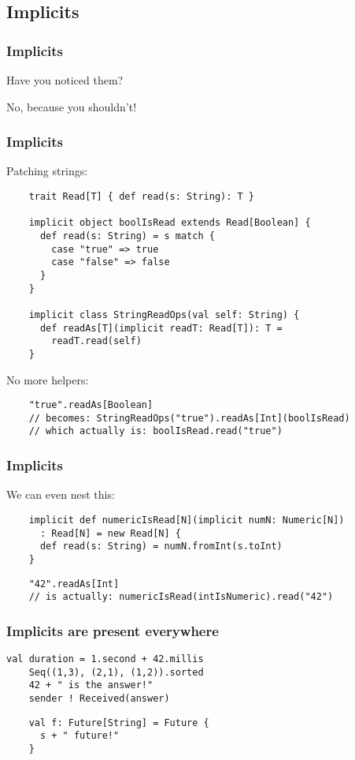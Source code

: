 \documentclass{beamer}
\begin{document}
\subsection{Implicits}

\begin{frame}
  \frametitle{Implicits}
  Have you noticed them?
  
  No, because you shouldn't!
\end{frame}

\begin{frame}[containsverbatim]
  \lstset{gobble=4}
  \frametitle{Implicits}
  Patching strings:
  \begin{lstlisting}
    trait Read[T] { def read(s: String): T }

    implicit object boolIsRead extends Read[Boolean] {
      def read(s: String) = s match {
        case "true" => true
        case "false" => false
      }
    }

    implicit class StringReadOps(val self: String) {
      def readAs[T](implicit readT: Read[T]): T = 
        readT.read(self)
    }
  \end{lstlisting}

  No more helpers:
  \begin{lstlisting}
    "true".readAs[Boolean] 
    // becomes: StringReadOps("true").readAs[Int](boolIsRead)
    // which actually is: boolIsRead.read("true")
  \end{lstlisting}
\end{frame}

\begin{frame}[containsverbatim]
  \lstset{gobble=4}
  \frametitle{Implicits}
  We can even nest this:
  \begin{lstlisting}
    implicit def numericIsRead[N](implicit numN: Numeric[N])
      : Read[N] = new Read[N] {
      def read(s: String) = numN.fromInt(s.toInt)
    }
  \end{lstlisting}
  \begin{lstlisting}
    "42".readAs[Int]  
    // is actually: numericIsRead(intIsNumeric).read("42")
  \end{lstlisting}
\end{frame}

\begin{frame}[containsverbatim]
  \lstset{gobble=4}
  \frametitle{Implicits are present everywhere}
  \begin{lstlisting}[lineskip=1ex]
    val duration = 1.second + 42.millis
    Seq((1,3), (2,1), (1,2)).sorted
    42 + " is the answer!"
    sender ! Received(answer)
  \end{lstlisting}
  \begin{lstlisting}
    val f: Future[String] = Future {
      s + " future!"
    }
  \end{lstlisting}
\end{frame}
\end{document}
